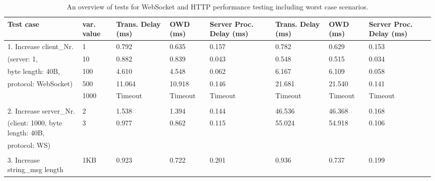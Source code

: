     \begin{table}[htbp]
        \footnotesize
    \centering
    \caption{An overview of tests for WebSocket and HTTP performance testing including worst case scenarios.}
    \label{tab: TestsProportional}
    \begin{tabular}{m{} m{} m{} m{} m{} m{} m{} m{}}
    \textbf{Test case}                        & \textbf{var. value} & \textbf{Trans. Delay (ms)} & \textbf{OWD (ms)} & \textbf{Server Proc. Delay (ms)} & \textbf{Trans. Delay (ms)} & \textbf{OWD (ms)} & \textbf{Server Proc. Delay (ms)} \\ \hline
    1. Increase client\_Nr.          & 1          & 0.792             & 0.635    & 0.157                   & 0.782             & 0.629    & 0.153                   \\
    (server: 1,                      & 10         & 0.882             & 0.839    & 0.043                   & 0.548             & 0.515    & 0.034                   \\
    byte length: 40B,                & 100        & 4.610             & 4.548    & 0.062                   & 6.167             & 6.109    & 0.058                   \\
    protocol: WebSocket)             & 500        & 11.064            & 10.918   & 0.146                   & 21.681            & 21.540   & 0.141                   \\
                                     & 1000       & Timeout           & Timeout  & Timeout                 & Timeout           & Timeout  & Timeout                 \\
    & & & & & & &\\
    2. Increase server\_Nr.          & 2          & 1.538             & 1.394    & 0.144                   & 46.536            & 46.368   & 0.168                   \\
    (client: 1000, byte length: 40B, & 3          & 0.977             & 0.862    & 0.115                   & 55.024            & 54.918   & 0.106                   \\
    protocol: WS)                    &            &                   &          &                         &                   &          &                         \\
    & & & & & & &\\
    3. Increase string\_msg length   & 1KB        & 0.923             & 0.722    & 0.201                   & 0.936             & 0.737    & 0.199                   \\

\end{tabular}
\end{table}

